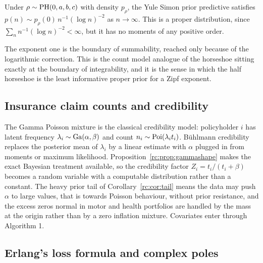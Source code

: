 \begin{proposition}\label{rc:prop:boundaryzipf}
Under $\rho\sim\mathrm{PH}(0,a,b,c)$ with density $p_\rho$, the Yule Simon prior predictive satisfies $p(n)\sim p_\rho(0)\,n^{-1}(\log n)^{-2}$ as $n\to\infty$. This is a proper distribution, since $\sum_nn^{-1}(\log n)^{-2}<\infty$, but it has no moments of any positive order.
\end{proposition}

The exponent one is the boundary of summability, reached only because of the logarithmic correction. This is the count model analogue of the horseshoe sitting exactly at the boundary of integrability, and it is the sense in which the half horseshoe is the least informative proper prior for a Zipf exponent.

\subsection{Insurance claim counts and credibility}

The Gamma Poisson mixture is the classical credibility model: policyholder $i$ has latent frequency $\lambda_i\sim\mathrm{Ga}(\alpha,\beta)$ and count $n_i\sim\mathrm{Poi}(\lambda_it_i)$. B\"uhlmann credibility replaces the posterior mean of $\lambda_i$ by a linear estimate with $\alpha$ plugged in from moments or maximum likelihood. Proposition~\ref{rc:prop:gammashape} makes the exact Bayesian treatment available, so the credibility factor $Z_i=t_i/(t_i+\beta)$ becomes a random variable with a computable distribution rather than a constant. The heavy prior tail of Corollary~\ref{rc:cor:tail} means the data may push $\alpha$ to large values, that is towards Poisson behaviour, without prior resistance, and the excess zeros normal in motor and health portfolios are handled by the mass at the origin rather than by a zero inflation mixture. Covariates enter through Algorithm 1.

\subsection{Erlang's loss formula and complex poles}\label{rc:sec:erlang}

